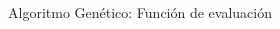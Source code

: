 \documentclass{beamer}
\begin{document}
\begin{frame}{Algoritmo Genético: Función de evaluación}
\begin{columns}
\begin{column}{0.5\textwidth}
\begin{overlayarea}{\textwidth}{\textheight}
{\begin{figure}
                    \end{figure}
                }
            \end{overlayarea}
        \end{column}
    \end{columns}
\end{frame}
\end{document}
